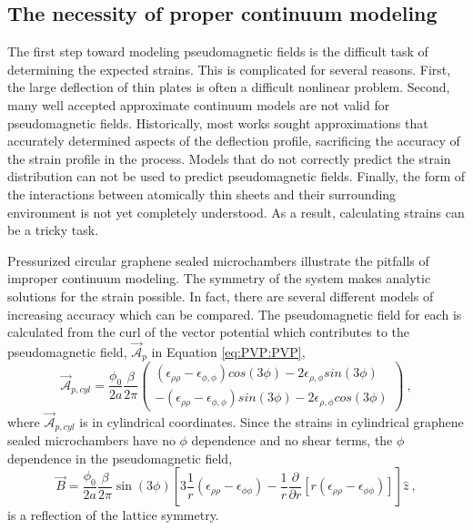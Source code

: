 \subsection{The necessity of proper continuum modeling\label{sec:PVP:GoodCont}}
The first step toward modeling pseudomagnetic fields is the difficult task of determining the expected strains.
This is complicated for several reasons.
First, the large deflection of thin plates is often a difficult nonlinear problem.
Second, many well accepted approximate continuum models are not valid for pseudomagnetic fields.
Historically, most works sought approximations that accurately determined aspects of the deflection profile, sacrificing the accuracy of the strain profile in the process.
Models that do not correctly predict the strain distribution can not be used to predict pseudomagnetic fields.
Finally, the form of the interactions between atomically thin sheets and their surrounding environment is not yet completely understood.
As a result, calculating strains can be a tricky task.

Pressurized circular graphene sealed microchambers illustrate the pitfalls of improper continuum modeling.
The symmetry of the system makes analytic solutions for the strain possible.
In fact, there are several different models of increasing accuracy which can be compared.
The pseudomagnetic field for each is calculated from the curl of the vector potential which contributes to the pseudomagnetic field, $\vec{\mathcal{A}}_p$ in Equation \ref{eq:PVP:PVP}, 
\begin{equation*}
\vec{\mathcal{A}}_{p,cyl}=\frac{\phi_0}{2a} \frac{\beta}{2 \pi}
  \left( \begin{array}{c}
    (\epsilon_{\rho\rho}-\epsilon_{\phi,\phi}) cos(3\phi)-2 \epsilon_{\rho,\phi} sin (3 \phi) \\
    -(\epsilon_{\rho\rho}-\epsilon_{\phi,\phi}) sin(3\phi)-2 \epsilon_{\rho,\phi} cos (3 \phi)
  \end{array} \right) \ ,
\end{equation*}
where $\vec{\mathcal{A}}_{p,cyl}$ is in cylindrical coordinates.
Since the strains in cylindrical graphene sealed microchambers have no $\phi$ dependence and no shear terms, the $\phi$ dependence in the pseudomagnetic field,
\begin{equation*}
  \vec{B}=\frac{\phi_0}{2a}\frac{\beta}{2 \pi} \sin(3 \phi) \left[ 
  3 \frac{1}{r} (\epsilon_{\rho\rho}-\epsilon_{\phi \phi})-
  \frac{1}{r} \frac{\partial}{\partial r} \left[ r (\epsilon_{\rho\rho}-\epsilon_{\phi \phi}) \right]
  \right] \hat{z} \ ,
\end{equation*}
is a reflection of the lattice symmetry.

